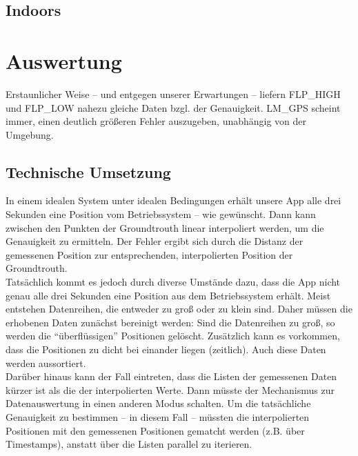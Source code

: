 \subsection{Indoors}


	
\section{Auswertung}	

Erstaunlicher Weise -- und entgegen unserer Erwartungen -- liefern FLP\_HIGH und FLP\_LOW nahezu gleiche Daten bzgl. der Genauigkeit. LM\_GPS scheint immer, einen deutlich größeren Fehler auszugeben, unabhängig von der Umgebung.

\subsection{Technische Umsetzung}

In einem idealen System unter idealen Bedingungen erhält unsere App alle drei Sekunden eine Position vom Betriebssystem -- wie gewünscht. Dann kann zwischen den Punkten der Groundtrouth linear interpoliert werden, um die Genauigkeit zu ermitteln. Der Fehler ergibt sich durch die Distanz der gemessenen Position zur entsprechenden, interpolierten Position der Groundtrouth. \\

Tatsächlich kommt es jedoch durch diverse Umstände dazu, dass die App nicht genau alle drei Sekunden eine Position aus dem Betriebssystem erhält. Meist entstehen Datenreihen, die entweder zu groß oder zu klein sind. Daher müssen die erhobenen Daten zunächst bereinigt werden: Sind die Datenreihen zu groß, so werden die "`überflüssigen"' Positionen gelöscht. Zusätzlich kann es vorkommen, dass die Positionen zu dicht bei einander liegen (zeitlich). Auch diese Daten werden aussortiert. \\

Darüber hinaus kann der Fall eintreten, dass die Listen der gemessenen Daten kürzer ist als die der interpolierten Werte. Dann müsste der Mechanismus zur Datenauswertung in einen anderen Modus schalten. Um die tatsächliche Genauigkeit zu bestimmen -- in diesem Fall -- müssten die interpolierten Positionen mit den gemessenen Positionen gematcht werden (z.B. über Timestamps), anstatt über die Listen parallel zu iterieren.

